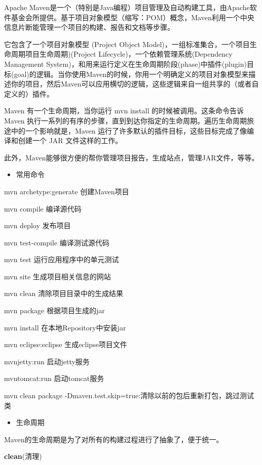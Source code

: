 \documentclass[
]{article}
\begin{document}
Apache
Maven是一个（特别是Java编程）项目管理及自动构建工具，由Apache软件基金会所提供。基于项目对象模型（缩写：POM）概念，Maven利用一个中央信息片断能管理一个项目的构建、报告和文档等步骤。

它包含了一个项目对象模型 (Project Object
Model)，一组标准集合，一个项目生命周期项目生命周期)(Project
Lifecycle)，一个依赖管理系统(Dependency Management
System)，和用来运行定义在生命周期阶段(phase)中插件(plugin)目标(goal)的逻辑。当你使用Maven的时候，你用一个明确定义的项目对象模型来描述你的项目，然后Maven可以应用横切的逻辑，这些逻辑来自一组共享的（或者自定义的）插件。

Maven 有一个生命周期，当你运行 mvn install 的时候被调用。这条命令告诉
Maven
执行一系列的有序的步骤，直到到达你指定的生命周期。遍历生命周期旅途中的一个影响就是，Maven
运行了许多默认的插件目标，这些目标完成了像编译和创建一个 JAR
文件这样的工作。

此外，Maven能够很方便的帮你管理项目报告，生成站点，管理JAR文件，等等。

\begin{itemize}
\item
  常用命令
\end{itemize}

mvn archetype:generate 创建Maven项目

mvn compile 编译源代码

mvn deploy 发布项目

mvn test-compile 编译测试源代码

mvn test 运行应用程序中的单元测试

mvn site 生成项目相关信息的网站

mvn clean 清除项目目录中的生成结果

mvn package 根据项目生成的jar

mvn install 在本地Repository中安装jar

mvn eclipse:eclipse 生成eclipse项目文件

mvnjetty:run 启动jetty服务

mvntomcat:run 启动tomcat服务

mvn clean package
-Dmaven.test.skip=true:清除以前的包后重新打包，跳过测试类

\begin{itemize}
\item
  生命周期
\end{itemize}

Maven的生命周期是为了对所有的构建过程进行了抽象了，便于统一。

\textbf{clean}(清理)
\end{document}
